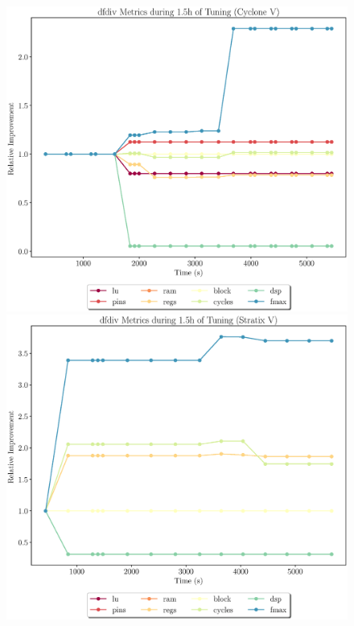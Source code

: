 \documentclass[12pt, a4paper]{article}
\begin{document}
\begin{figure}[htpb]
    \begin{minipage}{.48\textwidth}
        \includegraphics[scale=.29]{dfdiv_all_5400_chstone_CycloneV}
    \end{minipage}%
    \hfill
    \begin{minipage}{.48\textwidth}
        \includegraphics[scale=.29]{dfdiv_all_5400_chstone_StratixV}
    \end{minipage}%
\end{figure}
\end{document}
